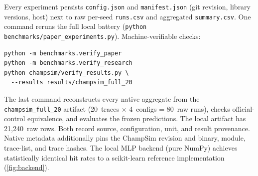 \documentclass[sigplan,anonymous,review,nonacm]{acmart}
\begin{document}
Every experiment persists \texttt{config.json} and \texttt{manifest.json}
(git revision, library versions, host) next to raw per-seed
\texttt{runs.csv} and aggregated \texttt{summary.csv}. One command reruns
the full local battery (\texttt{python benchmarks/paper\_experiments.py}).
Machine-verifiable checks:
{\small\begin{verbatim}
python -m benchmarks.verify_paper
python -m benchmarks.verify_research
python champsim/verify_results.py \
  --results results/champsim_full_20
\end{verbatim}}
The last command reconstructs every native aggregate from the
\texttt{champsim\_full\_20} artifact (20~traces $\times$ 4~configs = 80~raw runs),
checks official-control equivalence, and evaluates the frozen predictions.
The local artifact has 21,240~raw rows. Both record source, configuration,
unit, and result provenance. Native metadata additionally pins the ChampSim
revision and binary, module, trace-list, and trace hashes.
The local MLP backend (pure NumPy) achieves statistically identical hit
rates to a scikit-learn reference implementation (\cref{fig:backend}).



\end{document}
